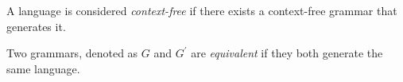 \begin{definition}
    A language is considered \emph{context-free} if there exists a context-free grammar that generates it.
    
    Two grammars, denoted as $G$ and $G^{'}$ are \emph{equivalent} if they both generate the same language.
\end{definition}